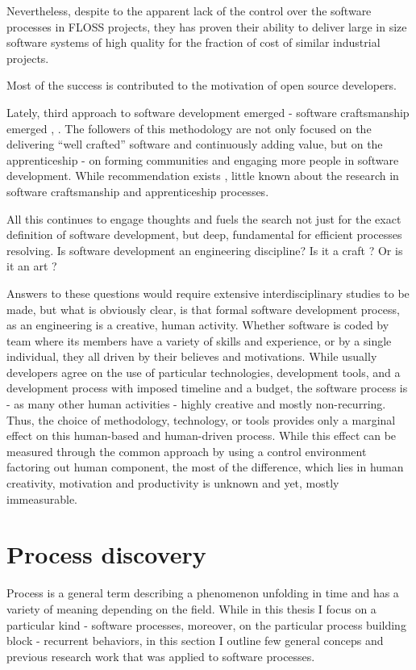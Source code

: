 Nevertheless, despite to the apparent lack of the control over the software processes in FLOSS projects, they 
has proven their ability to deliver large in size software systems of high quality for the fraction of cost 
of similar industrial projects.

Most of the success is contributed to the motivation of open source developers.

Lately, third approach to software development emerged - software craftsmanship emerged 
\cite{citeulike:11058561}, \cite{citeulike:11058554}. The followers of this methodology 
are not only focused on the delivering ``well crafted'' software and continuously adding value,
but on the apprenticeship - on forming communities and engaging more people in software development.
While recommendation exists \cite{citeulike:11058784}, little known about the research 
in software craftsmanship and apprenticeship processes.

All this continues to engage thoughts and fuels the search not just for the exact definition 
of software development, but deep, fundamental for efficient processes resolving. 
Is software development an engineering discipline? Is it a craft \cite{citeulike:5203446}? 
Or is it an art \cite{citeulike:11045694}?

Answers to these questions would require extensive interdisciplinary studies to be made, 
but what is obviously clear, is that formal software development process, as an engineering 
is a creative, human activity. 
Whether software is coded 
by team where its members have a variety of skills and experience, or by a single individual,
they all driven by their believes and motivations. While usually developers agree on the use of 
particular technologies, development tools, and a development process with imposed timeline and 
a budget, the software process is - as many other human activities - highly creative and mostly 
non-recurring. Thus, the choice of methodology, technology, or tools provides only a marginal 
effect on this human-based and human-driven process. While this effect can be measured through 
the common approach by using a control environment factoring out human component, the most of 
the difference, which lies in human creativity, motivation and productivity is unknown and yet, 
mostly immeasurable.

\section{Process discovery}\label{process.discovery} 
Process is a general term describing a phenomenon unfolding in time and has a variety of meaning depending
on the field. While in this thesis I focus on a particular kind - software processes, moreover, on the particular process 
building block - recurrent behaviors, in this section I outline few general conceps and previous research work that 
was applied to software processes.

